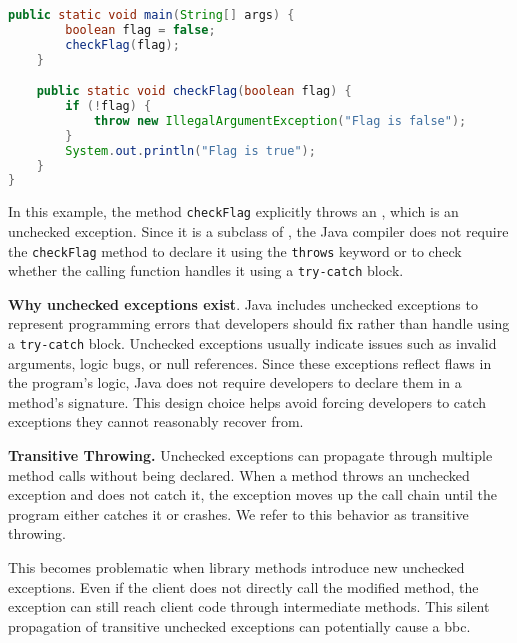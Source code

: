 \begin{itemize}
\begin{lstlisting}[language=java]
    public static void main(String[] args) {
        boolean flag = false;
        checkFlag(flag);
    }

    public static void checkFlag(boolean flag) {
        if (!flag) {
            throw new IllegalArgumentException("Flag is false");
        }
        System.out.println("Flag is true");
    }
}
    \end{lstlisting}
    In this example, the method \texttt{checkFlag} explicitly throws an \texttt{},
    which is an unchecked exception. Since it is a subclass of \texttt{}, the Java compiler
    does not require the \texttt{checkFlag} method to declare it using the \texttt{throws} keyword or
    to check whether the calling function handles it using a \texttt{try-catch} block.
\end{itemize}

\textbf{Why unchecked exceptions exist}. Java includes unchecked exceptions to represent programming errors that developers should fix rather than handle using a \texttt{try-catch} block. Unchecked exceptions usually indicate issues such as invalid arguments, logic bugs, or null references. Since these exceptions reflect flaws in the program's logic, Java does not require developers to declare them in a method’s signature. This design choice helps avoid forcing developers to catch exceptions they cannot reasonably recover from.

\textbf{Transitive Throwing.} Unchecked exceptions can propagate through multiple method calls without being declared. When a method throws an unchecked exception and does not catch it, the exception moves up the call chain until the program either catches it or crashes. We refer to this behavior as transitive throwing.

This becomes problematic when library methods introduce new unchecked exceptions. Even if the client does not directly call the modified method, the exception can still reach client code through intermediate methods. This silent propagation of transitive unchecked exceptions can potentially cause a \gls{bbc}.

